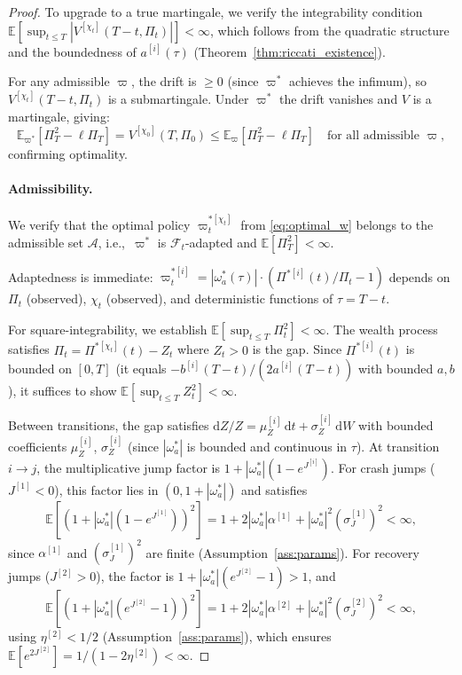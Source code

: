 \documentclass[11pt,a4paper]{article}
\numberwithin{equation}{section}
\newcommand{\E}{\mathbb{E}}
\newcommand{\F}{\mathcal{F}}
\newcommand{\dd}{\mathrm{d}}
\newcommand{\ie}{\textrm{i.e.,}}
\begin{document}
\begin{appendices}
\begin{proof}
To upgrade to a true martingale, we verify the integrability condition $\E[\sup_{t \leq T} |V^{[\chi_t]}(T-t, \Pi_t)|] < \infty$, which follows from the quadratic structure and the boundedness of $a^{[i]}(\tau)$ (Theorem~\ref{thm:riccati_existence}).

For any admissible $\varpi$, the drift is $\geq 0$ (since $\varpi^*$ 
achieves the infimum), so $V^{[\chi_t]}(T-t, \Pi_t)$ is a submartingale. 
Under $\varpi^*$ the drift vanishes and $V$ is a martingale, giving:
\begin{equation}
\E_{\varpi^*}[\Pi_T^2 - \ell \Pi_T] = V^{[\chi_0]}(T, \Pi_0) 
\leq \E_{\varpi}[\Pi_T^2 - \ell \Pi_T] \quad 
\text{for all admissible } \varpi,
\end{equation}
confirming optimality.


\paragraph{Admissibility.}\label{app:admissibility}

We verify that the optimal policy $\varpi^{*[\chi_t]}_t$ from \eqref{eq:optimal_w} belongs to the admissible set $\mathcal{A}$, \ie\ $\varpi^*$ is $\F_t$-adapted and $\E[\Pi_T^2] < \infty$.

Adaptedness is immediate: $\varpi^{*[i]}_t = |\omega^*_a(\tau)| \cdot (\Pi^{*[i]}(t)/\Pi_t - 1)$ depends on $\Pi_t$ (observed), $\chi_t$ (observed), and deterministic functions of $\tau = T - t$.

For square-integrability, we establish $\E[\sup_{t \leq T} \Pi_t^2] < \infty$.  The wealth process satisfies $\Pi_t = \Pi^{*[\chi_t]}(t) - Z_t$ where $Z_t > 0$ is the gap.  Since $\Pi^{*[i]}(t)$ is bounded on $[0, T]$ (it equals $-b^{[i]}(T-t)/(2a^{[i]}(T-t))$ with bounded $a, b$), it suffices to show $\E[\sup_{t \leq T} Z_t^2] < \infty$.

Between transitions, the gap satisfies $\dd Z/Z = \mu_Z^{[i]}\,\dd t + \sigma_Z^{[i]}\,\dd W$ with bounded coefficients $\mu_Z^{[i]}$, $\sigma_Z^{[i]}$ (since $|\omega^*_a|$ is bounded and continuous in $\tau$).  At transition $i \to j$, the multiplicative jump factor is $1 + |\omega^*_a|(1 - e^{J^{[i]}})$.  For crash jumps ($J^{[1]} < 0$), this factor lies in $(0, 1 + |\omega^*_a|)$ and satisfies
\begin{equation}\label{eq:jump_sq_integ}
\E[(1 + |\omega^*_a|(1 - e^{J^{[1]}}))^2] = 1 + 2|\omega^*_a|\alpha^{[1]} + |\omega^*_a|^2 (\sigma_J^{[1]})^2 < \infty,
\end{equation}
since $\alpha^{[1]}$ and $(\sigma_J^{[1]})^2$ are finite (Assumption~\ref{ass:params}).  For recovery jumps ($J^{[2]} > 0$), the factor is $1 + |\omega^*_a|(e^{J^{[2]}} - 1) > 1$, and
\begin{equation}\label{eq:jump_sq_integ2}
\E[(1 + |\omega^*_a|(e^{J^{[2]}} - 1))^2] = 1 + 2|\omega^*_a|\alpha^{[2]} + |\omega^*_a|^2 (\sigma_J^{[2]})^2 < \infty,
\end{equation}
using $\eta^{[2]} < 1/2$ (Assumption~\ref{ass:params}), which ensures $\E[e^{2J^{[2]}}] = 1/(1 - 2\eta^{[2]}) < \infty$.


\end{proof}
\end{appendices}
\end{document}
